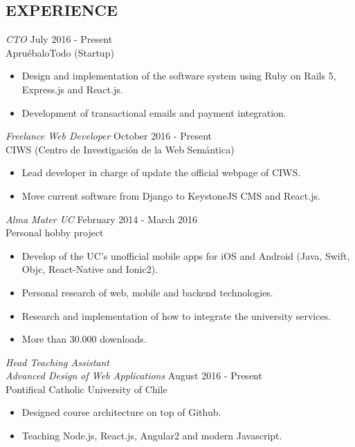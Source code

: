 \documentclass[margin, 10pt]{res} %
\begin{document}
\begin{resume}

\section{EXPERIENCE}

{\sl CTO} \hfill July 2016 - Present \\
ApruébaloTodo (Startup)
\begin{itemize}  \itemsep -2pt
\item Design and implementation of the software system using Ruby on Rails 5, Express.js and React.js.
\item Development of transactional emails and payment integration.
\end{itemize}

{\sl Freelance Web Developer} \hfill October 2016 - Present \\
CIWS (Centro de Investigación de la Web Semántica)
\begin{itemize}  \itemsep -2pt
\item Lead developer in charge of update the official webpage of CIWS.
\item Move current software from Django to KeystoneJS CMS and React.js.
\end{itemize}

{\sl Alma Mater UC } \hfill February 2014 - March 2016 \\
Personal hobby project
\begin{itemize}  \itemsep -2pt
\item Develop of the UC's unofficial mobile apps for iOS and Android (Java, Swift, Objc, React-Native and Ionic2).
\item Personal research of web, mobile and backend technologies.
\item Research and implementation of how to integrate the university services.
\item More than 30.000 downloads.
\end{itemize}

{\sl Head Teaching Assistant \\Advanced Design of Web Applications} \hfill August 2016 - Present \\
Pontifical Catholic University of Chile
\begin{itemize}  \itemsep -2pt
  \item Designed course architecture on top of Github.
  \item Teaching Node.js, React.js, Angular2 and modern Javascript.
\end{itemize}


\end{resume}
\end{document}
